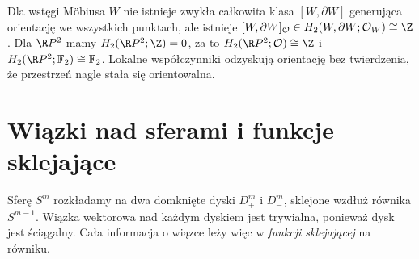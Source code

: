\begin{przyklad}
Dla wstęgi Möbiusa $W$
nie istnieje zwykła
całkowita klasa
$[W,\partial W]$
generująca orientację
we wszystkich punktach,
ale istnieje
$[W,\partial W]_{\mathcal O}
\in H_2(W,\partial W;\mathcal O_W)
\cong\Z$.
Dla $\R P^2$ mamy
$H_2(\R P^2;\Z)=0$,
za to
$H_2(\R P^2;\mathcal O)\cong\Z$
i $H_2(\R P^2;\mathbb F_2)
\cong\mathbb F_2$.
Lokalne współczynniki
odzyskują orientację
bez twierdzenia,
że przestrzeń nagle
stała się orientowalna.
\end{przyklad}

\section{Wiązki nad sferami i funkcje sklejające}
\label{sec:clutching-16}

Sferę $S^m$ rozkładamy na dwa
domknięte dyski $D^m_+$ i $D^m_-$,
sklejone wzdłuż równika
$S^{m-1}$. Wiązka wektorowa
nad każdym dyskiem jest
trywialna, ponieważ dysk
jest ściągalny. Cała informacja
o wiązce leży więc w
\emph{funkcji sklejającej}
na równiku.

